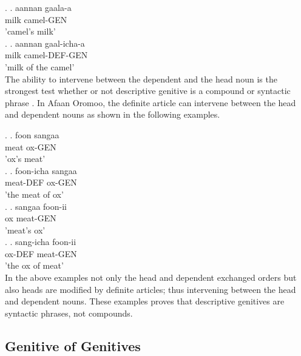 \documentclass[11pt,a4paper]{article}
\begin{document}
	\ex.
	\ag.
	aannan gaala-a \\
	milk camel-GEN\\
	'camel's milk'\\
	
	\ex.
	\ag.
	aannan gaal-icha-a \\
	milk camel-DEF-GEN\\
	'milk of the camel'\\
	
	The ability to intervene between the dependent and the head noun is the strongest test whether or not descriptive genitive is a compound or syntactic phrase \cite[85]{rosenbach2006descriptive}. In Afaan Oromoo, the definite article can intervene between the head and dependent nouns as shown in the following examples. 
	
	\ex.
	\ag.
	foon sangaa \\
	meat ox-GEN\\
	'ox's meat'\\
	
	\ex.
	\ag.
	foon-icha sangaa \\
	meat-DEF ox-GEN\\
	'the meat of ox'\\
	
	\ex.
	\ag.
	sangaa foon-ii\\
	ox meat-GEN\\
	'meat's ox'\\
	
	\ex.
	\ag.
	sang-icha foon-ii\\
	ox-DEF meat-GEN\\
	'the ox of meat'\\

	In the above examples not only the head and dependent exchanged orders but also heads are modified by definite articles; thus intervening between the head and dependent nouns. These examples proves that descriptive genitives are syntactic phrases, not compounds. 
	
	\subsection{Genitive of Genitives}
	
\end{document}

